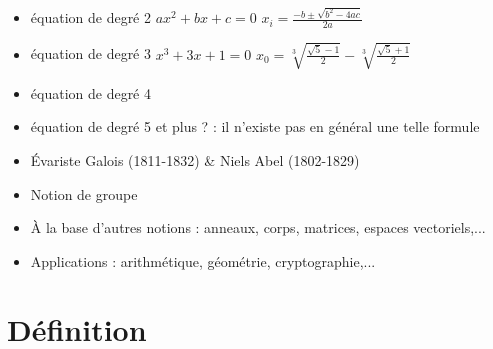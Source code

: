 \begin{frame}


\begin{itemize}
  \item équation de degré 2 \quad $ax^2+bx+c=0$ \quad  $x_i = \frac{-b\pm\sqrt{b^2-4ac}}{2a}$

\pause

  \item équation de degré 3 \quad $x^3+3x+1=0$ \quad $x_0 = \sqrt[3]{\frac{\sqrt 5 - 1}{2}} -  \sqrt[3]{\frac{\sqrt 5 + 1}{2}}$

\pause

  \item équation de degré 4

\pause

  \item équation de degré 5 et plus ? \pause : il n'existe pas en général une telle  formule

  \item \'Evariste Galois (1811-1832) \& Niels Abel (1802-1829) 

\pause
  \item Notion de \og groupe \fg

\pause
  \item \`A la base d'autres notions : anneaux, corps, matrices, espaces vectoriels,...

\pause
  \item Applications : arithmétique, géométrie, cryptographie,...
\end{itemize}

\end{frame}




\section*{Définition}


